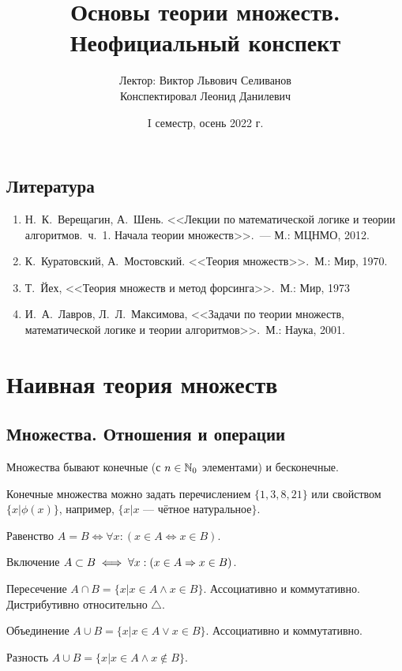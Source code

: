 \documentclass[a4paper]{report}
\date{I семестр, осень 2022 г.}
\title{Основы теории множеств. Неофициальный конспект}
\author{Лектор: Виктор Львович Селиванов \\Конспектировал Леонид Данилевич}
\begin{document}
    \maketitle
    \tableofcontents
    \newpage
    \setcounter{lection}{0}
    \section*{Литература}
    \begin{enumerate}
        \item Н.\ К.\ Верещагин, А.\ Шень.
        <<Лекции по математической логике и теории алгоритмов.\ ч.\ 1.
        Начала теории множеств>>.\ --- М.: МЦНМО, 2012.
        \item К.\ Куратовский, А.\ Мостовский.
        <<Теория множеств>>.\ М.: Мир, 1970.
        \item Т.\ Йех, <<Теория множеств и метод форсинга>>.\ М.: Мир, 1973
        \item И.\ А.\ Лавров, Л.\ Л.\ Максимова, <<Задачи по теории множеств, математической логике и теории алгоритмов>>.\ М.: Наука, 2001.
    \end{enumerate}


    \chapter{Наивная теория множеств}


    \section{Множества. Отношения и операции}
    Множества бывают конечные (с $n \in \mathbb{N}_0$ элементами) и бесконечные.

    Конечные множества можно задать перечислением $\{1, 3, 8, 21\}$ или свойством $\{x | \phi(x) \}$, например, $\{x|x\text{ --- чётное натуральное}\}$.

    Равенство $A = B \iff \forall x : (x \in A \iff x \in B)$.

    Включение $A \subset B \iff \forall x : (x \in A \Rightarrow x \in B)$.

    Пересечение $A \cap B = \{x | x \in A \land x \in B\}$.
    Ассоциативно и коммутативно.
    Дистрибутивно относительно $\triangle$.

    Объединение $A \cup B = \{x | x \in A \lor x \in B\}$.
    Ассоциативно и коммутативно.

    Разность $A \cup B = \{x | x \in A \land x \notin B\}$.
\end{document}
